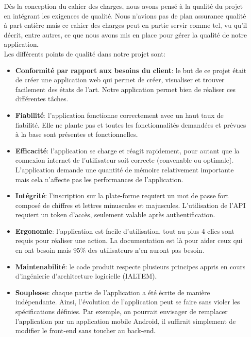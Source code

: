 \documentclass[t, 12pt, usenames,dvipsnames]{article}
\begin{document}
        \noindent Dès la conception du cahier des charges, nous avons pensé à la qualité du projet en intégrant les exigences de qualité. Nous n'avions pas de plan assurance qualité à part entière mais ce cahier des charges peut en partie servir comme tel, vu qu'il décrit, entre autres, ce que nous avons mis en place pour gérer la qualité de notre application.\\
        Les différents points de qualité dans notre projet sont:
        \begin{itemize}
            \item \textbf{Conformité par rapport aux besoins du client}: le but de ce projet était de créer une application web qui permet de créer, visualiser et trouver facilement des états de l'art. Notre application permet bien de réaliser ces différentes tâches.
            
            \item \textbf{Fiabilité}: l'application fonctionne correctement avec un haut taux de fiabilité. Elle ne plante pas et toutes les fonctionnalités demandées et prévues à la base sont présentes et fonctionnelles.
            
            \item \textbf{Efficacité}: l'application se charge et réagit rapidement, pour autant que la connexion internet de l'utilisateur soit correcte (convenable ou optimale). L'application demande une quantité de mémoire relativement importante mais cela n'affecte pas les performances de l'application.
            
            \item \textbf{Intégrité}: l'inscription sur la plate-forme requiert un mot de passe fort composé de chiffres et lettres minuscules et majuscules. L'utilisation de l'API requiert un token d'accès, seulement valable après authentification.
            
            \item \textbf{Ergonomie}: l'application est facile d'utilisation, tout au plus 4 clics sont requis pour réaliser une action. La documentation est là pour aider ceux qui en ont besoin mais 95\% des utilisateurs n'en auront pas besoin.
            
            \item \textbf{Maintenabilité}: le code produit respecte plusieurs principes appris en cours d'ingénierie d'architecture logicielle (IALTEM).
            \item \textbf{Souplesse}: chaque partie de l'application a été écrite de manière indépendante. Ainsi, l'évolution de l'application peut se faire sans violer les spécifications définies. Par exemple, on pourrait envisager de remplacer l'application par un application mobile Android, il suffirait simplement de modifier le front-end sans toucher au back-end.


\end{itemize}
\end{document}
